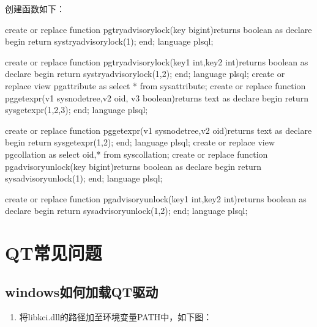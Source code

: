 \documentclass[a4,10pt,oneside,english]{sphinxmanual}
\begin{document}
创建函数如下：

\begin{sphinxVerbatim}[commandchars=\\\{\}]
create or replace function pg\PYGZus{}try\PYGZus{}advisory\PYGZus{}lock(key bigint)returns boolean
       as \PYGZdl{}\PYGZdl{}
       declare
       begin
       return sys\PYGZus{}try\PYGZus{}advisory\PYGZus{}lock(\PYGZdl{}1);
       end;
       \PYGZdl{}\PYGZdl{}language plsql;

       create or replace function pg\PYGZus{}try\PYGZus{}advisory\PYGZus{}lock(key1 int,key2 int)returns boolean
       as \PYGZdl{}\PYGZdl{}
       declare
begin
 return sys\PYGZus{}try\PYGZus{}advisory\PYGZus{}lock(\PYGZdl{}1,\PYGZdl{}2);
end;
\PYGZdl{}\PYGZdl{}language plsql;
create or replace view pg\PYGZus{}attribute as select * from sys\PYGZus{}attribute;
create or replace function pg\PYGZus{}get\PYGZus{}expr(v1 sys\PYGZus{}node\PYGZus{}tree,v2  oid, v3 boolean)returns text
as \PYGZdl{}\PYGZdl{}
declare
begin
 return sys\PYGZus{}get\PYGZus{}expr(\PYGZdl{}1,\PYGZdl{}2,\PYGZdl{}3);
end;
\PYGZdl{}\PYGZdl{}language plsql;

create or replace function pg\PYGZus{}get\PYGZus{}expr(v1 sys\PYGZus{}node\PYGZus{}tree,v2  oid)returns text
as \PYGZdl{}\PYGZdl{}
declare
begin
 return sys\PYGZus{}get\PYGZus{}expr(\PYGZdl{}1,\PYGZdl{}2);
end;
\PYGZdl{}\PYGZdl{}language plsql;
create or replace view pg\PYGZus{}collation as select oid,* from sys\PYGZus{}collation;
create or replace function pg\PYGZus{}advisory\PYGZus{}unlock(key bigint)returns boolean
as \PYGZdl{}\PYGZdl{}
declare
begin
 return sys\PYGZus{}advisory\PYGZus{}unlock(\PYGZdl{}1);
end;
\PYGZdl{}\PYGZdl{}language plsql;

create or replace function pg\PYGZus{}advisory\PYGZus{}unlock(key1 int,key2 int)returns boolean
as \PYGZdl{}\PYGZdl{}
declare
begin
 return sys\PYGZus{}advisory\PYGZus{}unlock(\PYGZdl{}1,\PYGZdl{}2);
end;
\PYGZdl{}\PYGZdl{}language plsql;
\end{sphinxVerbatim}


\section{QT常见问题}
\label{\detokenize{interface/qt:qt}}\label{\detokenize{interface/qt::doc}}

\subsection{windows如何加载QT驱动}
\label{\detokenize{interface/qt:windowsqt}}\begin{enumerate}
%
\item {} 
将libkci.dll的路径加至环境变量PATH中，如下图：

\end{enumerate}
\end{document}
